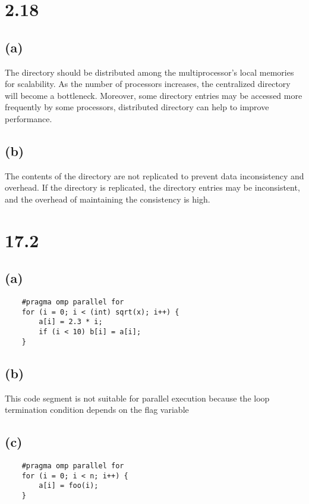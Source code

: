 \section*{2.18}
\subsection*{(a)}
The directory should be distributed among the multiprocessor's local memories for scalability. As the number of processors increases, the centralized directory will become a bottleneck. Moreover, some directory entries may be accessed more frequently by some processors, distributed directory can help to improve performance.

\subsection*{(b)}
The contents of the directory are not replicated to prevent data inconsistency and overhead. If the directory is replicated, the directory entries may be inconsistent, and the overhead of maintaining the consistency is high.

\section*{17.2}
\subsection*{(a)}
\begin{lstlisting}
    #pragma omp parallel for
    for (i = 0; i < (int) sqrt(x); i++) {
        a[i] = 2.3 * i; 
        if (i < 10) b[i] = a[i];
    }
\end{lstlisting}
\subsection*{(b)}
This code segment is not suitable for parallel execution because the loop termination condition depends on the flag variable
\subsection*{(c)}
\begin{lstlisting}
    #pragma omp parallel for
    for (i = 0; i < n; i++) {
        a[i] = foo(i);
    }
\end{lstlisting}
